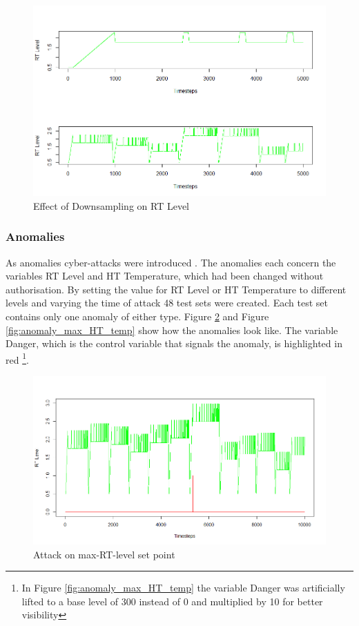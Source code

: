 \begin{figure}[h]
	\centering
	\includegraphics[scale=0.6]{Figures/downsample}
	\decoRule
	\caption[Effect of Downsampling]{Effect of Downsampling on RT Level \parencite{Own}}
	\label{fig:downsample}
\end{figure}

\newpage
\subsubsection{Anomalies} \label{GHL_Anomalies}
As anomalies cyber-attacks were introduced \parencite{Filonov2016}. The anomalies each concern the variables RT Level and HT Temperature, which had been changed without authorisation. By setting the value for RT Level or HT Temperature to different levels and varying the time of attack 48 test sets were created. Each test set contains only one anomaly of either type. Figure \ref{fig:anomaly_max_RT_level} and Figure \ref{fig:anomaly_max_HT_temp} show how the anomalies look like. The variable Danger, which is the control variable that signals the anomaly, is highlighted in red \footnote{In Figure \ref{fig:anomaly_max_HT_temp} the variable Danger was artificially lifted to a base level of 300 instead of 0 and multiplied by 10 for better visibility}.

\begin{figure}[h]
	\centering
	\includegraphics[scale=0.4]{Figures/anomaly_max_RT_level}
	\decoRule
	\caption[Attack on max-RT-level set point]{Attack on max-RT-level set point \parencite{Own}}
	\label{fig:anomaly_max_RT_level}
\end{figure}

